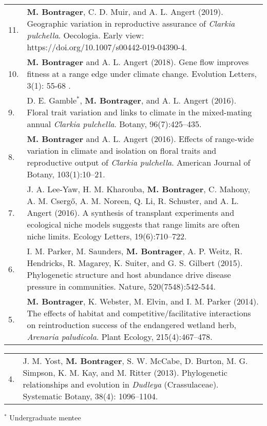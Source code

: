 \documentclass[letterpaper,11pt,oneside]{article}
\begin{document}
\def\arraystretch{1.2}
\noindent \begin{tabular}{@{} p{1cm} >{\raggedright\arraybackslash}p{15.11cm}}
11. & \textbf{M. Bontrager}, C. D. Muir, and A. L. Angert (2019). Geographic variation in reproductive assurance of \textit{Clarkia pulchella}. Oecologia. Early view: https://doi.org/10.1007/s00442-019-04390-4. \\
10. & \textbf{M. Bontrager} and A. L. Angert (2018). Gene flow improves fitness at a range edge under climate change. Evolution Letters, 3(1): 55-68 . \\
9. & D. E. Gamble$^{*}$, \textbf{M. Bontrager}, and A. L. Angert (2016). Floral trait variation and links to climate in the mixed-mating annual \textit{Clarkia pulchella}. Botany, 96(7):425–435. \\
8. & \textbf{M. Bontrager} and A. L. Angert (2016). Effects of range-wide variation in climate and isolation on floral traits and reproductive output of \textit{Clarkia pulchella}. American Journal of Botany, 103(1):10–21.  \\
7. & J. A. Lee-Yaw, H. M. Kharouba, \textbf{M. Bontrager}, C. Mahony, A. M. Cserg{\H{o}}, A. M. Noreen, Q. Li, R. Schuster, and A. L. Angert (2016). A synthesis of transplant experiments and ecological niche models suggests that range limits are often niche limits. Ecology Letters, 19(6):710–722. \\
6. & I. M. Parker, M. Saunders, \textbf{M. Bontrager}, A. P. Weitz, R. Hendricks, R. Magarey, K. Suiter, and G. S. Gilbert (2015). Phylogenetic structure and host abundance drive disease pressure in communities. Nature, 520(7548):542-544. \\
5. & \textbf{M. Bontrager}, K. Webster, M. Elvin, and I. M. Parker (2014). The effects of habitat and competitive/facilitative interactions on reintroduction success of the endangered wetland herb, \textit{Arenaria paludicola}. Plant Ecology, 215(4):467–478. \\
\end{tabular}
\def\arraystretch{1.2}
\noindent \begin{tabular}{@{} p{1cm} >{\raggedright\arraybackslash}p{15.11cm}}
4. & J. M. Yost, \textbf{M. Bontrager}, S. W. McCabe, D. Burton, M. G. Simpson, K. M. Kay, and M. Ritter (2013). Phylogenetic relationships and evolution in \textit{Dudleya} (Crassulaceae). Systematic Botany, 38(4): 1096–1104. \\
\end{tabular}

\smallskip
\noindent $^{*}$ Undergraduate mentee
\egroup
\end{document}
